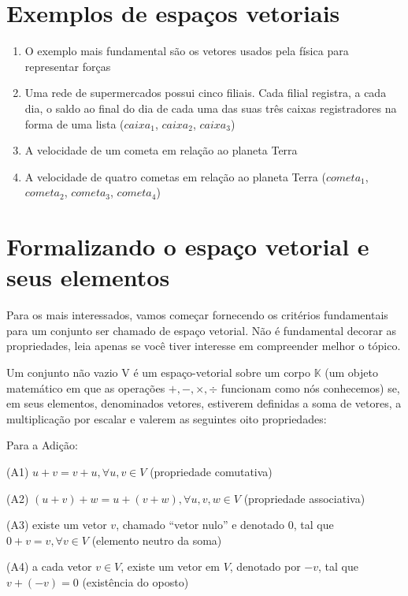 \documentclass[
  letterpaper,
  DIV=11,
  numbers=noendperiod]{scrreprt}
\providecommand{\tightlist}{%
  \setlength{\itemsep}{0pt}\setlength{\parskip}{0pt}}\usepackage{longtable,booktabs,array}
\begin{document}
\section{Exemplos de espaços
vetoriais}\label{exemplos-de-espauxe7os-vetoriais}

\begin{enumerate}
\def\labelenumi{\arabic{enumi}.}
\tightlist
\item
  O exemplo mais fundamental são os vetores usados pela física para
  representar forças
\item
  Uma rede de supermercados possui cinco filiais. Cada filial registra,
  a cada dia, o saldo ao final do dia de cada uma das suas três caixas
  registradores na forma de uma lista (\(caixa_{1}\), \(caixa_{2}\),
  \(caixa_{3}\))
\item
  A velocidade de um cometa em relação ao planeta Terra
\item
  A velocidade de quatro cometas em relação ao planeta Terra
  (\(cometa_{1}\), \(cometa_{2}\), \(cometa_{3}\), \(cometa_{4}\))
\end{enumerate}

\section{Formalizando o espaço vetorial e seus
elementos}\label{formalizando-o-espauxe7o-vetorial-e-seus-elementos}

Para os mais interessados, vamos começar fornecendo os critérios
fundamentais para um conjunto ser chamado de espaço vetorial. Não é
fundamental decorar as propriedades, leia apenas se você tiver interesse
em compreender melhor o tópico.

Um conjunto não vazio V é um espaço-vetorial sobre um corpo
\(\mathbb{K}\) (um objeto matemático em que as operações
\(+, -, \times,\div\) funcionam como nós conhecemos) se, em seus
elementos, denominados vetores, estiverem definidas a soma de vetores, a
multiplicação por escalar e valerem as seguintes oito propriedades:

Para a Adição:

(A1) \(u+v = v+u,  \forall  u,v \in V\) (propriedade comutativa)

(A2) \((u+v)+w = u+(v+w),  \forall  u,v,w \in V\) (propriedade
associativa)

(A3) existe um vetor \(v\), chamado ``vetor nulo'' e denotado \(0\), tal
que \(0+v=v, \forall v \in V\) (elemento neutro da soma)

(A4) a cada vetor \(v \in V\), existe um vetor em \(V\), denotado por
\(-v\), tal que \(v+(-v)=0\) (existência do oposto)
\end{document}
